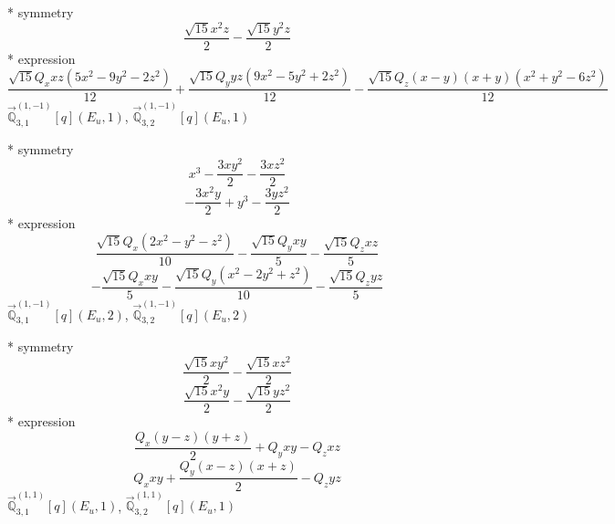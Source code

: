 \documentclass[fleqn,8pt]{jsarticle}
\begin{document}
\noindent\quad ** symmetry
\begin{dmath*}
\frac{\sqrt{15} x^{2} z}{2} - \frac{\sqrt{15} y^{2} z}{2}
\end{dmath*}
\noindent\quad ** expression
\begin{dmath*}
\frac{\sqrt{15} Q_{x} x z \left(5 x^{2} - 9 y^{2} - 2 z^{2}\right)}{12} + \frac{\sqrt{15} Q_{y} y z \left(9 x^{2} - 5 y^{2} + 2 z^{2}\right)}{12} - \frac{\sqrt{15} Q_{z} \left(x - y\right) \left(x + y\right) \left(x^{2} + y^{2} - 6 z^{2}\right)}{12}
\end{dmath*}
\noindent\quad $\vec{\mathbb{Q}}_{3,1}^{(1,-1)}[q](E_{u},1)$, $\vec{\mathbb{Q}}_{3,2}^{(1,-1)}[q](E_{u},1)$

\noindent\quad ** symmetry
\begin{dmath*}
x^{3} - \frac{3 x y^{2}}{2} - \frac{3 x z^{2}}{2}
\end{dmath*}
\begin{dmath*}
- \frac{3 x^{2} y}{2} + y^{3} - \frac{3 y z^{2}}{2}
\end{dmath*}
\noindent\quad ** expression
\begin{dmath*}
\frac{\sqrt{15} Q_{x} \left(2 x^{2} - y^{2} - z^{2}\right)}{10} - \frac{\sqrt{15} Q_{y} x y}{5} - \frac{\sqrt{15} Q_{z} x z}{5}
\end{dmath*}
\begin{dmath*}
- \frac{\sqrt{15} Q_{x} x y}{5} - \frac{\sqrt{15} Q_{y} \left(x^{2} - 2 y^{2} + z^{2}\right)}{10} - \frac{\sqrt{15} Q_{z} y z}{5}
\end{dmath*}
\noindent\quad $\vec{\mathbb{Q}}_{3,1}^{(1,-1)}[q](E_{u},2)$, $\vec{\mathbb{Q}}_{3,2}^{(1,-1)}[q](E_{u},2)$

\noindent\quad ** symmetry
\begin{dmath*}
\frac{\sqrt{15} x y^{2}}{2} - \frac{\sqrt{15} x z^{2}}{2}
\end{dmath*}
\begin{dmath*}
\frac{\sqrt{15} x^{2} y}{2} - \frac{\sqrt{15} y z^{2}}{2}
\end{dmath*}
\noindent\quad ** expression
\begin{dmath*}
\frac{Q_{x} \left(y - z\right) \left(y + z\right)}{2} + Q_{y} x y - Q_{z} x z
\end{dmath*}
\begin{dmath*}
Q_{x} x y + \frac{Q_{y} \left(x - z\right) \left(x + z\right)}{2} - Q_{z} y z
\end{dmath*}
\noindent\quad $\vec{\mathbb{Q}}_{3,1}^{(1,1)}[q](E_{u},1)$, $\vec{\mathbb{Q}}_{3,2}^{(1,1)}[q](E_{u},1)$
\end{document}
